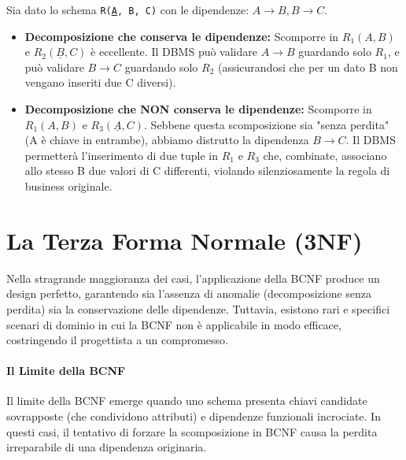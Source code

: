 \begin{example}
Sia dato lo schema \texttt{R(\underline{A}, B, C)} con le dipendenze: $A \rightarrow B, B \rightarrow C$.
\begin{itemize}
    \item \textbf{Decomposizione che conserva le dipendenze:} Scomporre in $R_1(A, B)$ e $R_2(\underline{B}, C)$ è eccellente. Il DBMS può validare $A \rightarrow B$ guardando solo $R_1$, e può validare $B \rightarrow C$ guardando solo $R_2$ (assicurandosi che per un dato B non vengano inseriti due C diversi).
    \item \textbf{Decomposizione che NON conserva le dipendenze:} Scomporre in $R_1(A, B)$ e $R_3(\underline{A}, C)$. Sebbene questa scomposizione sia "senza perdita" (A è chiave in entrambe), abbiamo distrutto la dipendenza $B \rightarrow C$. Il DBMS permetterà l'inserimento di due tuple in $R_1$ e $R_3$ che, combinate, associano allo stesso B due valori di C differenti, violando silenziosamente la regola di business originale.
\end{itemize}
\end{example}

\section{La Terza Forma Normale (3NF)}

Nella stragrande maggioranza dei casi, l'applicazione della BCNF produce un design perfetto, garantendo sia l'assenza di anomalie (decomposizione senza perdita) sia la conservazione delle dipendenze. Tuttavia, esistono rari e specifici scenari di dominio in cui la BCNF non è applicabile in modo efficace, costringendo il progettista a un compromesso.

\paragraph{Il Limite della BCNF}
Il limite della BCNF emerge quando uno schema presenta chiavi candidate sovrapposte (che condividono attributi) e dipendenze funzionali incrociate. In questi casi, il tentativo di forzare la scomposizione in BCNF causa la perdita irreparabile di una dipendenza originaria.

